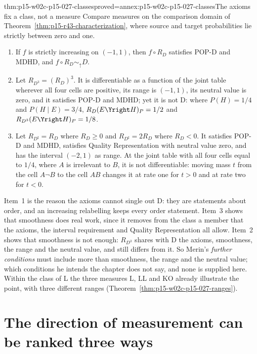 \begin{hbtheorem}{thm:p15-w02c-p15-027-classes}{proved=annex:p15-w02c-p15-027-classes}{The axioms fix a class, not a measure}
Compare measures on the comparison domain of
Theorem~\ref{thm:p15-r43-characterization}, where source and target
probabilities lie strictly between zero and one.
\begin{enumerate}
\item If \(f\) is strictly increasing on \((-1,1)\), then
  \(f\circ R_D\) satisfies POP-D and MDHD, and \(f\circ R_D\sim_{\uparrow}D\).
\item Let \(R_{D^3}=(R_D)^3\). It is differentiable as a function of the
  joint table wherever all four cells are positive, its range is
  \((-1,1)\), its neutral value is zero, and it satisfies POP-D and MDHD;
  yet it is not D: where \(P(H)=1/4\) and \(P(H\mid E)=3/4\),
  \(R_D(E\Yright H)_P=1/2\) and \(R_{D^3}(E\Yright H)_P=1/8\).
\item Let \(R_{D^\sharp}=R_D\) where \(R_D\geq0\) and
  \(R_{D^\sharp}=2R_D\) where \(R_D<0\). It satisfies POP-D and MDHD,
  satisfies Quality Representation with neutral value zero, and has the
  interval \((-2,1)\) as range. At the joint table with all four cells
  equal to \(1/4\), where \(A\) is irrelevant to \(B\), it is not
  differentiable: moving mass \(t\) from the cell \(A\neg B\) to the cell
  \(AB\) changes it at rate one for \(t>0\) and at rate two for \(t<0\).
\end{enumerate}
\end{hbtheorem}

Item~1 is the reason the axioms cannot single out D: they are
statements about order, and an increasing relabelling keeps every order
statement. Item~3 shows that smoothness does real work, since it removes
from the class a member that the axioms, the interval requirement and
Quality Representation all allow. Item~2 shows that smoothness is not
enough: \(R_{D^3}\) shares with D the axioms, smoothness, the range and
the neutral value, and still differs from it. So Merin's \emph{further
conditions} must include more than smoothness, the range and the neutral
value; which conditions he intends the chapter does not say, and none is
supplied here. Within the class of L the three measures L, LL and KO
already illustrate the point, with three different ranges
(Theorem~\ref{thm:p15-w02c-p15-027-ranges}).

\section{The direction of measurement can be ranked three ways}
\label{sec:p15-w02c-p15-027-direction}

